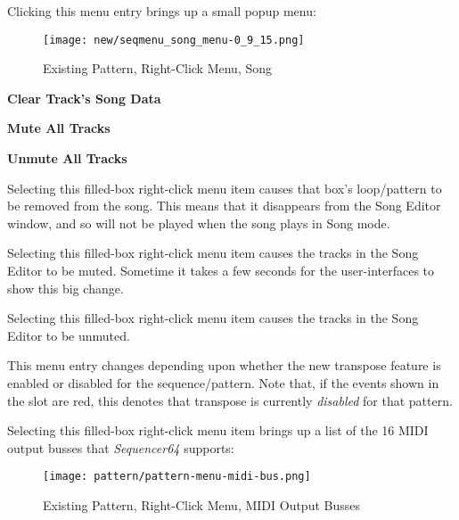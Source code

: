    Clicking this menu entry brings up a small popup menu:

\begin{figure}[H]
   \centering 
   \texttt{[image: new/seqmenu\_song\_menu-0\_9\_15.png]}
   \caption{Existing Pattern, Right-Click Menu, Song}
   \label{fig:pattern_window_right_click_song}
\end{figure}

   \begin{enumber}
      \item \textbf{Clear Track's Song Data}
      \item \textbf{Mute All Tracks}
      \item \textbf{Unmute All Tracks}
   \end{enumber}

   \setcounter{ItemCounter}{0}      %

   Selecting this filled-box right-click menu item causes that box's
   loop/pattern to be removed from the song.  This means
   that it disappears from the Song Editor window, and so will not
   be played when the song plays in Song mode.

   Selecting this filled-box right-click menu item causes
   the tracks in the Song Editor to be muted.  Sometime it takes a few seconds
   for the user-interfaces to show this big change.

   Selecting this filled-box right-click menu item causes
   the tracks in the Song Editor to be unmuted.

   This menu entry changes depending upon whether the new transpose feature is
   enabled or disabled for the sequence/pattern.  Note that, if the events
   shown in the slot are red, this denotes that transpose is currently
   \textsl{disabled} for that pattern.

   Selecting this filled-box right-click menu item brings up a list
   of the 16 MIDI output busses that \textsl{Sequencer64} supports:

\begin{figure}[H]
   \centering 
   \texttt{[image: pattern/pattern-menu-midi-bus.png]}
   \caption{Existing Pattern, Right-Click Menu, MIDI Output Busses}
   \label{fig:pattern_window_right_click_midi_bus}
\end{figure}

